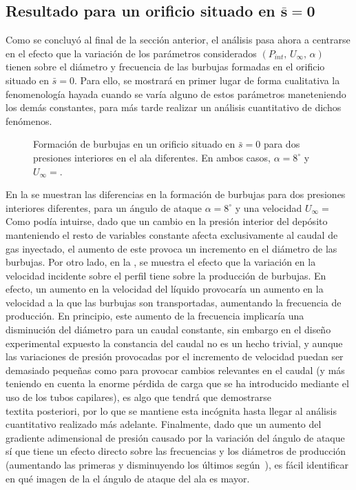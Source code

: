 \subsection{Resultado para un orificio situado en $\mathbf{\bar{s} = 0}$}

Como se concluyó al final de la sección anterior, el análisis pasa ahora a centrarse en el efecto que la variación de los parámetros considerados $\left(P_{int},\,U_{\infty},\,\alpha\right)$ tienen sobre el diámetro y frecuencia de las burbujas formadas en el orificio situado en $\bar{s} = 0$. Para ello, se mostrará en primer lugar de forma cualitativa la fenomenología hayada cuando se varía alguno de estos parámetros maneteniendo los demás constantes, para más tarde realizar un análisis cuantitativo de dichos fenómenos. 

\begin{figure}
\centering
{}
\caption{Formación de burbujas en un orificio situado en $\bar{s} = 0$ para dos presiones interiores en el ala diferentes. En ambos casos, $\alpha = 8^{\circ}$ y $U_{\infty} = $.}
\end{figure}

En la  se muestran las diferencias en la formación de burbujas para dos presiones interiores diferentes, para un ángulo de ataque $\alpha = 8^{\circ}$ y una velocidad $U_{\infty} = $ %
Como podía intuirse, dado que un cambio en la presión interior del depósito manteniendo el resto de variables constante afecta exclusivamente al caudal de gas inyectado,  el aumento de este  provoca un incremento en el diámetro de las burbujas. Por otro lado, en la , se muestra el efecto que la variación en la velocidad incidente sobre el perfil tiene sobre la producción de burbujas. En efecto, un aumento en la velocidad del líquido provocaría un aumento en la velocidad a la que las burbujas son transportadas, aumentando la frecuencia de producción. En principio, este aumento de la frecuencia implicaría una disminución del diámetro para un caudal constante, sin embargo en el diseño experimental expuesto la constancia del caudal no es un hecho trivial, y aunque las variaciones de presión provocadas por el incremento de velocidad puedan ser demasiado pequeñas como para provocar cambios relevantes en el caudal (y más teniendo en cuenta la enorme pérdida de carga que se ha introducido mediante el uso de los tubos capilares), es algo que tendrá que demostrarse \\textit{a posteriori}, por lo que se mantiene esta incógnita hasta llegar al análisis cuantitativo realizado más adelante. Finalmente, dado que un aumento del gradiente adimensional de presión causado por la variación del ángulo de ataque sí que tiene un efecto directo sobre las frecuencias y los diámetros de producción (aumentando las primeras y disminuyendo los últimos según~\cite{Evangelio2015}), es fácil identificar en qué imagen  de  la  el ángulo de ataque del ala es mayor.


